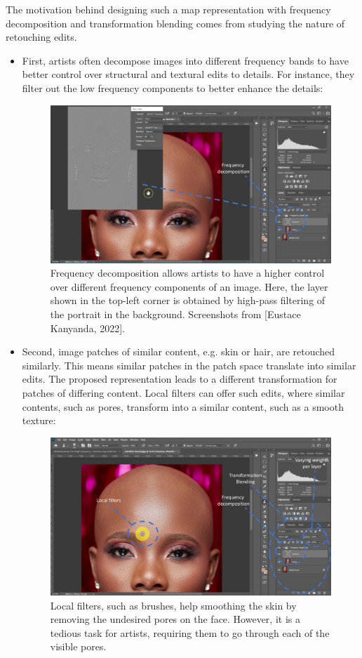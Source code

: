 The motivation behind designing such a map representation with frequency decomposition and transformation blending comes from studying the nature of retouching edits. 
\begin{itemize}
\item First, artists often decompose images into different frequency bands to have better control over structural and textural edits to details. For instance, they filter out the low frequency components to better enhance the details:

\begin{figure}[ht]
\centering
\includegraphics[width=0.75\columnwidth]{Chapters/detail-retouching-figs/PS1.pdf}
    \caption{Frequency decomposition allows artists to have a higher control over different frequency components of an image. Here, the layer shown in the top-left corner is obtained by high-pass filtering of the portrait in the background. Screenshots from [Eustace Kanyanda, 2022].}

\label{fig:PS-high-pass}
\end{figure}

\item Second, image patches of similar content, e.g. skin or hair, are retouched similarly. This means similar patches in the patch space translate into similar edits. The proposed representation leads to a different transformation for patches of differing content. Local filters can offer such edits, where similar contents, such as pores, transform into a similar content, such as a smooth texture:
\begin{figure}[ht]
\centering
\includegraphics[width=0.75\columnwidth]{Chapters/detail-retouching-figs/PS3.pdf}
    \caption{Local filters, such as brushes, help smoothing the skin by removing the undesired pores on the face. However, it is a tedious task for artists, requiring them to go through each of the visible pores.}


\end{figure}
\end{itemize}
